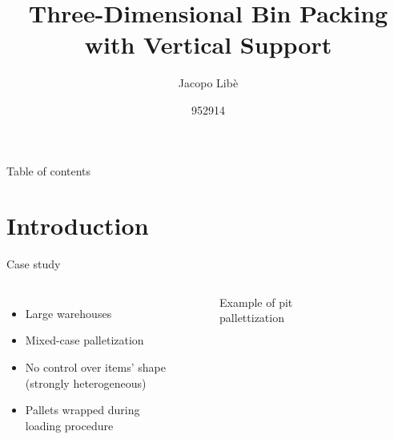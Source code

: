 \documentclass{beamer}
\title{Three-Dimensional Bin Packing \\ with Vertical Support}
\subtitle{}
\author{Jacopo Libè}
\date{952914}
\begin{document}
    \begin{frame}
        \maketitle
    \end{frame}
    
    \begin{frame}{Table of contents}
      \tableofcontents
    \end{frame}
    
    \section{Introduction}
    \begin{frame}{Case study}
        \begin{columns}[onlytextwidth,T]
            \column{\dimexpr\linewidth-55mm-5mm}
                \begin{itemize}
                    \item Large warehouses
                    \item Mixed-case palletization
                    \item No control over items' shape (strongly heterogeneous)
                    \item Pallets wrapped during loading procedure
                \end{itemize}
                \vspace{-5mm}
                \begin{figure}[H]
                    \caption{Example of pit pallettization} %
                \end{figure}
            \column{55mm}
                \begin{figure}

\end{figure}
\end{columns}
\end{frame}
\end{document}
